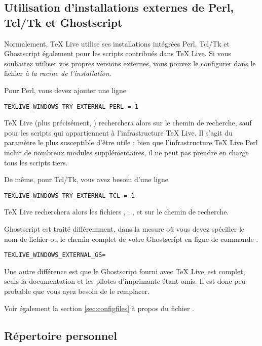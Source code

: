 \documentclass[german, english, french]{article}
\renewcommand{\TL}{\TeX{} Live\xspace}%
\begin{document}
\subsection{Utilisation d'installations externes de Perl, Tcl/Tk et Ghostscript}
\label{sec:externalwndws}

Normalement, \TL{} utilise ses installations intégrées Perl, Tcl/Tk et
Ghostscript également pour les scripts contribués dans \TL. Si vous souhaitez
utiliser vos propres versions externes, vous pouvez le configurer dans le
fichier  \emph{à la racine de l'installation}.

Pour Perl, vous devez ajouter une ligne
\begin{verbatim}
TEXLIVE_WINDOWS_TRY_EXTERNAL_PERL = 1
\end{verbatim}
\TL{} (plus précisément, ) recherchera alors
 sur le chemin de recherche, sauf pour les scripts qui
appartiennent à l'infrastructure \TL{}. Il s'agit du paramètre le plus
susceptible d'être utile ; bien que l'infrastructure \TL{} Perl inclut de
nombreux modules supplémentaires, il ne peut pas prendre en charge tous les
scripts tiers.

De même, pour Tcl/Tk, vous avez besoin d'une ligne
\begin{verbatim}
TEXLIVE_WINDOWS_TRY_EXTERNAL_TCL = 1
\end{verbatim}
\TL{} recherchera alors les fichiers , ,
,  et  sur le chemin de
recherche.

Ghostscript est traité différemment, dans la mesure où vous devez spécifier le
nom de fichier ou le chemin complet de votre Ghostscript en ligne de commande :
\begin{alltt}
TEXLIVE_WINDOWS_EXTERNAL_GS = 
\end{alltt}
Une autre différence est que le Ghostscript fourni avec \TL\ est complet, seuls
la documentation et les pilotes d'imprimante étant omis.  Il est donc peu
probable que vous ayez besoin de le remplacer.

Voir également la section \ref{sec:configfiles} à propos du fichier .

\subsection{Répertoire personnel}
\label{sec:winhome}
\end{document}
